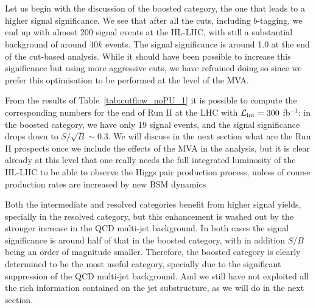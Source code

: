 \begin{table}[t]
  \centering
  \scriptsize
  
  $\,$ \\
  \vspace{0.5cm}
  
  $\,$ \\
  \vspace{0.5cm}
    
    \caption{\small The cross-sections, in pb,
      for the signal and the various background
      processes at different points of the
      cut-flow, for the resolved (upper table),
      intermediate (middle table) and boosted
      (lower table) categories, for the analysis
      without PU.
      In each case, we also provide the signal over
      background ratio, $S/B$, and the signal
      significance, $S/\sqrt{B}$, considering either
      the total background or only the $4b$ component.
 \label{tab:cutflow_noPU_1}}
\end{table}



%
Let us begin with the discussion of the boosted category, the one that
leads to a higher signal significance.
%
We see that after all the cuts, including $b$-tagging,
we end up with almost 200 signal events at the HL-LHC, with
still a substantial background of around $40k$ events.
%
The signal significance is around 1.0 at the end of the
cut-based analysis.
%
While it should have been possible to increase this significance
but using more aggressive cuts, we have refrained doing so
since we prefer this optimisation to be performed at the level of
the MVA.


From the results of Table~\ref{tab:cutflow_noPU_1}
it is possible to compute the corresponding numbers
for the end of Run II at the LHC with
$\mathcal{L}_{\rm int}=300$ fb$^{-1}$: in the boosted category,
we have only
19 signal events, and the signal significance drops down to
$S/\sqrt{B}\sim 0.3$.
%
We will discuss in the next section what are the Run II prospects
once we include the effects of the MVA in the analysis, but
it is clear already at this level that one really needs the full
integrated luminosity of the HL-LHC to be able to observe
the Higgs pair production process, unless  of course production rates are
increased by new BSM dynamics

Both the intermediate and resolved categories benefit from higher signal yields,
specially in the resolved category, but this enhancement is washed out by the stronger
increase in the QCD multi-jet background.
%
In both cases the signal significance is around half of that in the boosted category,
with in addition $S/B$ being an order of magnitude smaller.
%
Therefore, the boosted category is clearly determined to be the most useful category,
specially due to the significant suppression of the QCD multi-jet background.
%
And we still have not exploited all the rich information contained on the jet
substructure, as we will do in the next section.



